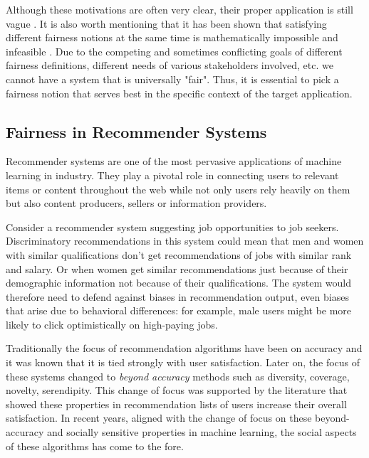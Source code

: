Although these motivations are often very clear, their proper application is still vague \cite{xiang2019legal}. It is also worth mentioning that it has been shown that satisfying different fairness notions at the same time is mathematically impossible and infeasible \cite{Kleinberg:InherentTrade,chouldechova2017fair}. Due to the competing and sometimes conflicting goals of different fairness definitions, different needs of various stakeholders involved, etc. we cannot have a system that is universally "fair". Thus, it is essential to pick a fairness notion that serves best in the specific context of the target application. 

\subsection{Fairness in Recommender Systems}
Recommender systems are one of the most pervasive applications of machine learning in industry. They play a pivotal role in connecting users to relevant items or content throughout the web while not only users rely heavily on them but also content producers, sellers or information providers.

Consider a recommender system suggesting job opportunities to job seekers. Discriminatory recommendations in this system could mean that men and women with similar qualifications don't get recommendations of jobs with similar rank and salary. Or when women get similar recommendations just because of their demographic information not because of their qualifications. The system would therefore need to defend against biases in recommendation output, even biases that arise due to behavioral differences: for example, male users might be more likely to click optimistically on high-paying jobs.

Traditionally the focus of recommendation algorithms have been on accuracy and it was known that it is tied strongly with user satisfaction. Later on, the focus of these systems changed to \emph{beyond accuracy} methods such as diversity, coverage, novelty, serendipity. This change of focus was supported by the literature that showed these properties in recommendation lists of users increase their overall satisfaction.
In recent years, aligned with the change of focus on these beyond-accuracy and socially sensitive properties in machine learning, the social aspects of these algorithms has come to the fore.

